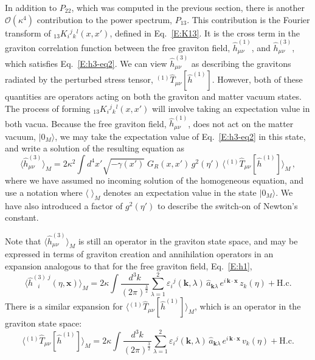 \documentclass[preprint,prd,showpacs,superscriptaddress]{revtex4}
\begin{document}
 In addition to $P_{22}$, which was computed in the previous section, there is another $\mathcal{O}(\kappa^{4})$ 
 contribution to the power spectrum, $P_{13}$.   This contribution is the Fourier transform of 
 ${}_{13}K_{i}{}^{j}{}_{k}{}^{l}(x,x')$, defined in Eq.~\eqref{E:K13}. It is the cross term in the graviton correlation
 function between the free graviton field,  $\hat{h}^{(1)}_{\mu\nu}$, and $\hat{h}^{(3)}_{\mu\nu}$, which satisfies
 Eq.~\eqref{E:h3-eq2}. We can view $\hat{h}^{(3)}_{\mu\nu}$ as describing the gravitons radiated by the perturbed
 stress tensor, ${}^{(1)}\hat{T}_{\mu\nu}[\hat{h}^{(1)}]$. However, both of these quantities are operators acting on both
the graviton and matter vacuum states.  The process of forming   ${}_{13}K_{i}{}^{j}{}_{k}{}^{l}(x,x')$ will involve
taking an expectation value in both vacua. Because the free graviton field, $\hat{h}^{(1)}_{\mu\nu}$, does not
act on the matter vacuum, $\vert 0_{M}\rangle$, we may take the expectation value of Eq.~\eqref{E:h3-eq2} in this state,
and write a solution of the resulting equation as
\begin{equation}
\langle \hat{h}^{(3)}_{\mu\nu} \rangle_M = 2\kappa^{2}\!\int\!d^{4}x'\sqrt{-\gamma(x')}\;G_{R}(x,x')\, g^2(\eta')\,
\langle   {}^{(1)}\hat{T}_{\mu\nu}[\hat{h}^{(1)}] \rangle_M \,, 
\label{E:h3-1}
\end{equation}
 where we have assumed no incoming solution of the homogeneous equation, and use a notation where $\langle \; \rangle_M$
 denotes an expectation value in the state $\vert0_{M}\rangle$. We have also introduced a factor of $g^2(\eta')$ to describe
 the switch-on of Newton's constant.
 
 Note that $\langle \hat{h}^{(3)}_{\mu\nu} \rangle_M$ is still an operator in the graviton state space, and may be expressed in
 terms of graviton creation and annihilation operators in an expansion analogous to that for the free graviton field, 
 Eq.~\eqref{E:h1},
\begin{equation}\label{E:h3}
\langle\hat{h}^{(3)\;j}_{\;\;\; i}(\eta,\mathbf{x})\rangle_M=2\kappa\int\!\frac{d^{3}k}{(2\pi)^{\frac{3}{2}}}
\sum_{\lambda=1}^{2}\varepsilon_{i}{}^{j}(\mathbf{k},\lambda)\,\hat{a}_{\mathbf{k}\lambda}\,e^{i\,\mathbf{k}\cdot\mathbf{x}}
\,z_k(\eta)+\text{H.c.}
\end{equation}
There is a similar expansion for $\langle   {}^{(1)}\hat{T}_{\mu\nu}[\hat{h}^{(1)}] \rangle_M$, which is an operator in the
graviton state space:
 \begin{equation}\label{E:T1}
\langle   {}^{(1)}\hat{T}_{\mu\nu}[\hat{h}^{(1)}] \rangle_M = 2\kappa\int\!\frac{d^{3}k}{(2\pi)^{\frac{3}{2}}}
\sum_{\lambda=1}^{2}\varepsilon_{i}{}^{j}(\mathbf{k},\lambda)\,\hat{a}_{\mathbf{k}\lambda}\,e^{i\,\mathbf{k}\cdot\mathbf{x}}
\,v_k(\eta)+\text{H.c.}
\end{equation}
\end{document}
